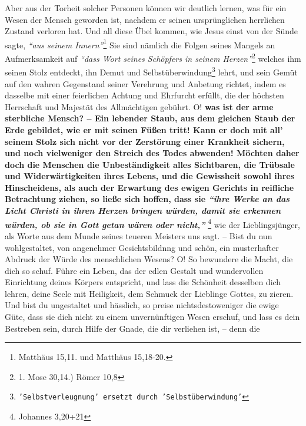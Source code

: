 Aber aus der Torheit solcher Personen können wir deutlich lernen, was für ein
Wesen der Mensch geworden ist, nachdem er seinen ursprünglichen herrlichen
Zustand verloren hat. Und all diese Übel kommen, wie Jesus einst von der
Sünde
sagte,
\textit{"`aus seinem Innern"'}\footnote{Matthäus 15,11. und Matthäus 15,18-20.}
Sie sind nämlich
die Folgen seines Mangels an Aufmerksamkeit auf
\textit{"`dass Wort seines Schöpfers in
seinem Herzen"'}\footnote{1. Mose 30,14.) Römer 10,8}
welches ihm seinen Stolz
entdeckt, ihn Demut und
Selbstüberwindung\footnote{\texttt{'Selbstverleugnung' ersetzt durch
'Selbstüberwindung'}}
lehrt, und sein Gemüt auf den
wahren Gegenstand seiner Verehrung und Anbetung richtet, indem es dasselbe mit
einer feierlichen Achtung und Ehrfurcht erfüllt, die der höchsten Herrschaft und
Majestät des Allmächtigen gebührt. O!  
 \label{ref:11_10_juengstes_gericht}
\textbf{was ist der arme sterbliche Mensch? --
Ein lebender Staub, aus dem gleichen Staub der Erde gebildet, wie er mit seinen
Füßen tritt! Kann er doch mit all' seinem Stolz sich nicht vor der Zerstörung
einer Krankheit sichern, und noch vielweniger den Streich des Todes abwenden!
Möchten daher doch die Menschen die Unbeständigkeit alles Sichtbaren, die
Trübsale und Widerwärtigkeiten ihres Lebens, und die Gewissheit sowohl ihres
Hinscheidens, als auch der Erwartung des ewigen Gerichts in reifliche
Betrachtung ziehen, so ließe sich hoffen, dass sie
\textit{"`ihre Werke an das Licht
Christi in ihren Herzen bringen würden, damit sie erkennen würden, ob sie in
Gott
getan wären oder nicht,"'} }\footnote{Johannes 3,20+21}
wie der Lieblingsjünger, als
Worte aus dem Munde seines teueren Meisters uns sagt. -- Bist du nun
wohlgestaltet, von angenehmer Gesichtsbildnng und schön, ein musterhafter
Abdruck der Würde des menschlichen Wesens? O! So bewundere die Macht, die dich
so schuf. Führe ein Leben, das der edlen Gestalt und wundervollen Einrichtung
deines Körpers entspricht, und lass die Schönheit desselben dich lehren, deine
Seele mit Heiligkeit, dem Schmuck der
Lieblinge Gottes, zu zieren. Und bist du
ungestaltet und hässlich, so preise nichtsdestoweniger die ewige Güte, dass sie
dich nicht zu einem unvernünftigen Wesen erschuf, und lass es dein Bestreben
sein, durch Hilfe der Gnade, die dir verliehen ist, --  denn die
